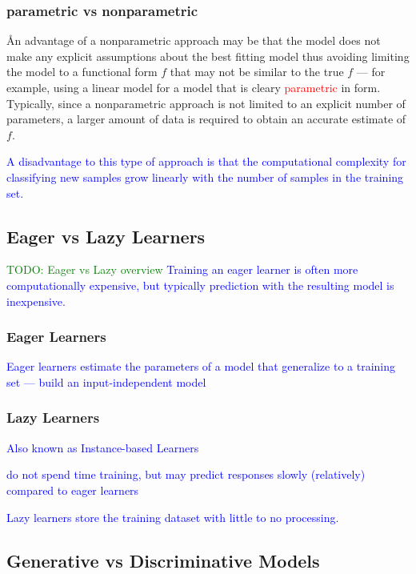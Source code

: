 \subsubsection{parametric vs nonparametric}

\r{An advantage of a nonparametric approach may be that the model does not make any explicit assumptions about the best fitting model thus avoiding limiting the model to a functional form $f$ that may not be similar to the true $f$ --- for example, using a linear model for a model that is cleary \textcolor{red}{parametric} in form. Typically, since a nonparametric approach is not limited to an explicit number of parameters, a larger amount of data is required to obtain an accurate estimate of $f$.}

\textcolor{blue}{A disadvantage to this type of approach is that the computational complexity for classifying new samples grow linearly with the number of samples in the training set.}



\subsection{Eager vs Lazy Learners}

\textcolor{green}{TODO: Eager vs Lazy overview}
\textcolor{blue}{Training an eager learner is often more computationally expensive, but typically prediction with the resulting model is inexpensive.}

\subsubsection{Eager Learners}

\textcolor{blue}{Eager learners estimate the parameters of a model that generalize to a training set --- build an input-independent model}

\subsubsection{Lazy Learners}

\textcolor{blue}{Also known as Instance-based Learners}

\textcolor{blue}{do not spend time training, but may predict responses slowly (relatively) compared to eager learners}

\textcolor{blue}{Lazy learners store the training dataset with little to no processing.}


\subsection{Generative vs Discriminative Models}

